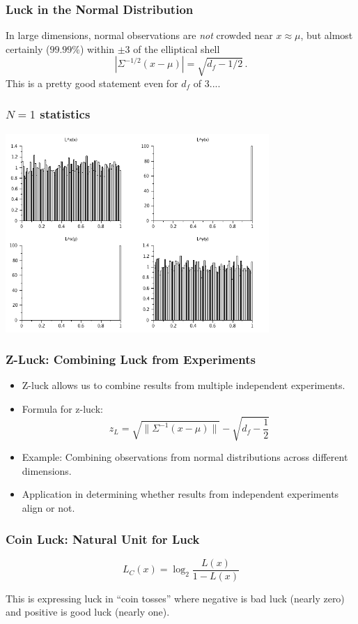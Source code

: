 \documentclass{beamer}
\begin{document}
\begin{frame}
  \frametitle{Luck in the Normal Distribution}
  In large dimensions, normal observations are {\em not} crowded near $x \approx \mu$, but almost certainly ($99.99\%$) within $\pm 3$ of the elliptical shell
  \[
    |\Sigma^{-1/2}(x-\mu)|=\sqrt{d_f-1/2} \,.
  \]
This is a pretty good statement even for $d_f$ of 3....
\end{frame}

\begin{frame}
\frametitle{$N=1$ statistics}
\begin{center}
\includegraphics[width=0.75\textwidth]{img/normal}
\end{center}
\end{frame}

\begin{frame}
\frametitle{Z-Luck: Combining Luck from Experiments}
\begin{itemize}
    \item Z-luck allows us to combine results from multiple independent experiments.
    \item Formula for z-luck:
    \[
    z_L = \sqrt{\|\Sigma^{-1}(x - \mu)\|} - \sqrt{d_f - \frac{1}{2}}
    \]
    \item Example: Combining observations from normal distributions across different dimensions.
    \item Application in determining whether results from independent experiments align or not.
\end{itemize}
\end{frame}

\begin{frame}
  \frametitle{Coin Luck: Natural Unit for Luck}
  \[ L_C(x) = \log_2 \frac{L(x)}{1-L(x)} \]

  This is expressing luck in ``coin tosses'' where negative is bad luck (nearly zero) and positive is good luck (nearly one).
\end{frame}
\end{document}
